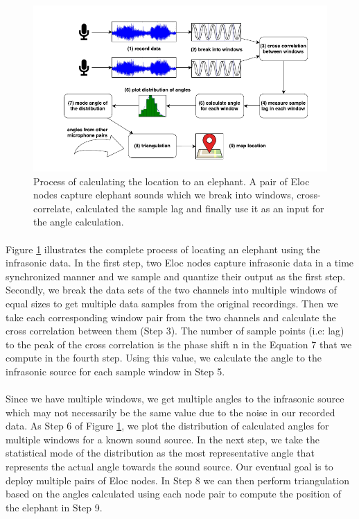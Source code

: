 \documentclass[12pt]{article}
\numberwithin{figure}{section}
\numberwithin{table}{section}
\begin{document}
\begin{figure}[H]
\centering
\includegraphics[width= \textwidth]{crosscor_implementation.png}
\caption{Process of calculating the location to an elephant.
A pair of Eloc nodes capture elephant sounds which we
break into windows, cross-correlate, calculated the sample
lag and finally use it as an input for the angle calculation.}
\label{crosscor_implementation}
\end{figure}

\paragraph{}
Figure \ref{crosscor_implementation} illustrates the complete process of locating an elephant using the infrasonic data. In the first step, two Eloc nodes capture infrasonic data in a time synchronized manner and we sample and quantize their output as the first step. Secondly, we break the data sets of the two channels into multiple windows of equal sizes to get multiple data samples from the original recordings. Then we take each corresponding window pair from the two channels and calculate
the cross correlation between them (Step 3). The number of sample points (i.e: lag) to the peak of the cross correlation
is the phase shift n in the Equation 7 that we compute in the fourth step. Using this value, we calculate the angle to the
infrasonic source for each sample window in Step 5.

\paragraph{}
Since we have multiple windows, we get multiple angles to the infrasonic source which may not necessarily be the
same value due to the noise in our recorded data. As Step 6 of Figure \ref{crosscor_implementation}, we plot the distribution of calculated angles for multiple windows for a known sound source. In the next step, we take the statistical mode of the distribution as the most representative angle that represents the actual angle towards the sound source. Our eventual goal is to deploy multiple pairs of Eloc nodes. In Step 8 we can then perform triangulation based on the angles calculated using each node pair to compute the position of the elephant in Step 9.
\end{document}
